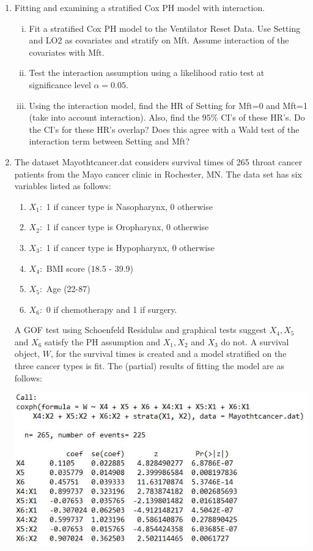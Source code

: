 \documentclass[12pt]{article}
\begin{document}
\begin{enumerate}[1.]
\item Fitting and examining a stratified Cox PH model with interaction.
\begin{enumerate}[i.]
\item Fit a stratified Cox PH model to the Ventilator Reset Data. Use Setting and LO2 as covariates and stratify on Mft. Assume interaction of the covariates with Mft.
\item Test the interaction assumption using a likelihood ratio test at significance level $\alpha=0.05$.
\item Using the interaction model, find the HR of Setting for Mft=0 and Mft=1 (take into account interaction). Also, find the $95\%$ CI's of these HR's. Do the CI's for these HR's overlap? Does this agree with a Wald test of the interaction term between Setting and Mft?
\end{enumerate}
\item The dataset Mayothtcancer.dat considers survival times of 265 throat cancer patients from the Mayo cancer clinic in Rochester, MN. The data set has six variables listed as follows:
\begin{enumerate}[ ]
\item $X_1:$ 1 if cancer type is Nasopharynx, 0 otherwise
\item $X_2:$ 1 if cancer type is Oropharynx, 0 otherwise
\item $X_3:$ 1 if cancer type is Hypopharynx, 0 otherwise
\item $X_4:$ BMI score (18.5 - 39.9)
\item $X_5:$ Age (22-87)
\item $X_6:$  0 if chemotherapy and 1 if surgery.
\end{enumerate}
A GOF test using Schoenfeld Residulas and graphical tests suggest $X_4, X_5$ and $X_6$ satisfy the PH assumption and $X_1,X_2$ and $X_3$ do not. A survival object, $W$, for the survival times is created and a model stratified on the three cancer types is fit. The (partial) results of fitting the model are as follows:
\begin{center}
\includegraphics[scale=.9]{HW4_Q5.JPG}

\end{center}
\end{enumerate}
\end{document}
